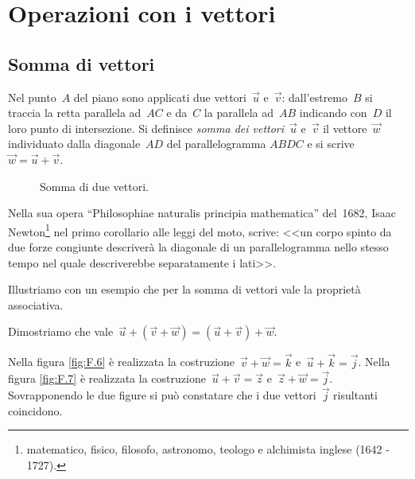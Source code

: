 \ovalbox{\risolvi \ref{ese:F.1}}

\section{Operazioni con i vettori}

\subsection{Somma di vettori}

\begin{definizione}
Nel punto~$A$ del piano sono applicati due vettori~$\vec{u}$ e~$\vec{v}$: dall'estremo~$B$ si
traccia la retta parallela ad~$AC$ e da~$C$ la parallela ad~$AB$ indicando con~$D$ il loro punto di intersezione.
Si definisce \emph{somma dei vettori}~$\vec{u}$ e~$\vec{v}$ il vettore~$\vec{w}$ individuato dalla diagonale~$AD$ del parallelogramma $ABDC$ e si scrive~$\vec{w}=\vec{u}+\vec{v}$.
\end{definizione}

\begin{figure}[h]
\centering

 \caption{Somma di due vettori.}\label{fig:F.5}
\end{figure}

Nella sua opera ``Philosophiae naturalis principia mathematica'' del~1682, Isaac Newton\footnote{matematico, fisico, filosofo, astronomo, teologo e alchimista inglese (1642 - 1727).} nel primo corollario alle leggi del moto,
scrive: <<un corpo spinto da due forze congiunte descriverà la diagonale di un parallelogramma nello stesso tempo nel quale descriverebbe separatamente i lati>>.

\vspazio\ovalbox{\risolvi \ref{ese:F.2}}

Illustriamo con un esempio che per la somma di vettori vale la proprietà associativa.

\begin{exrig}
\begin{esempio}
Dimostriamo che vale~$\vec{u}+(\vec{v}+\vec{w})=(\vec{u}+\vec{v})+\vec{w}$.

Nella figura \ref{fig:F.6} è realizzata la costruzione~$\vec{v}+\vec{w}=\vec{k}$ e~$\vec{u}+\vec{k}=\vec{j}$.
Nella figura \ref{fig:F.7} è realizzata la costruzione~$\vec{u}+\vec{v}=\vec{z}$ e~$\vec{z}+\vec{w}=\vec{j}$.
Sovrapponendo le due figure si può constatare che i due vettori~$\vec{j}$ risultanti coincidono.
\end{esempio}
\end{exrig}

